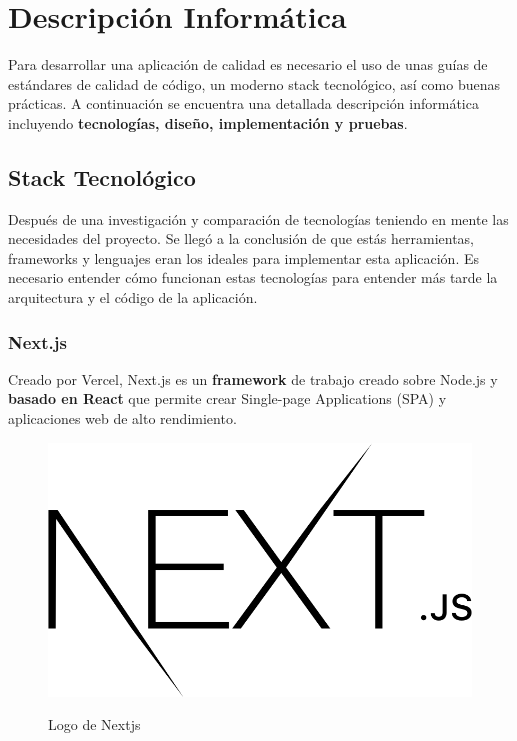 \documentclass[12pt,twoside,titlepage]{report}
\begin{document}
\chapter{Descripción Informática}

Para desarrollar una aplicación de calidad es necesario el uso de unas guías de estándares de calidad de código, un moderno stack tecnológico, así como buenas prácticas. A continuación se encuentra una detallada descripción informática incluyendo \textbf{tecnologías, diseño, implementación y pruebas}.

\section{Stack Tecnológico}

Después de una investigación y comparación de tecnologías teniendo en mente las necesidades del proyecto. Se llegó a la conclusión de que estás herramientas, frameworks y lenguajes eran los ideales para implementar esta aplicación. Es necesario entender cómo funcionan estas tecnologías para entender más tarde la arquitectura y el código de la aplicación.

\subsection{Next.js}

Creado por Vercel, Next.js es un \textbf{framework} de trabajo creado sobre Node.js y \textbf{basado en React} que permite crear Single-page Applications (SPA) y aplicaciones web de alto rendimiento.

\begin{figure}[H]
    \centering
    \includegraphics[scale=0.14]{Nextjs/Nextjs}
    \label{fig:NextjsLogo}
    \caption{Logo de Nextjs}
\end{figure}
\end{document}
